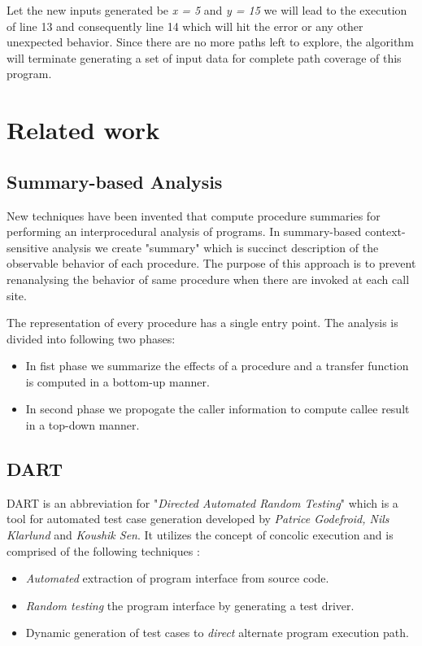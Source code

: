 \documentclass[12pt,oneside]{book}
\begin{document}
Let the new inputs generated be \textit{x = 5} and \textit{y = 15} we will lead to the execution of line 13 and consequently line 14 which will hit the error or any other unexpected behavior. Since there are no more paths left to explore, the algorithm will terminate generating a set of input data for complete path coverage of this program.


\section {Related work}


\subsection {Summary-based Analysis}
New techniques have been invented that compute procedure summaries for performing an interprocedural analysis of programs. In summary-based context-sensitive analysis we create "summary"\cite{summary} which is succinct description of the observable behavior of each procedure. The purpose of this approach is to prevent renanalysing the behavior of same procedure when there are invoked at each call site.

The representation of every procedure has a single entry point. The analysis is divided into following two phases:
\begin{itemize}
  \item In fist phase we summarize the effects of a procedure and a transfer function is computed in a bottom-up manner.
  \item  In second phase we propogate the caller information to compute callee result in a top-down manner.
\end{itemize}


\subsection {DART}
DART is an abbreviation for "\textit{Directed Automated Random Testing}"\cite{dart} which is a tool for automated test case generation developed by \textit{Patrice Godefroid, Nils Klarlund} and \textit{Koushik Sen}. It utilizes the concept of concolic execution and is comprised of the following techniques :
\begin{itemize}
 \item \textit{Automated} extraction of program interface from source code.
 \item \textit{Random testing} the program interface by generating a test driver. 
 \item Dynamic generation of test cases to \textit{direct} alternate program execution path.
\end{itemize}
\end{document}
